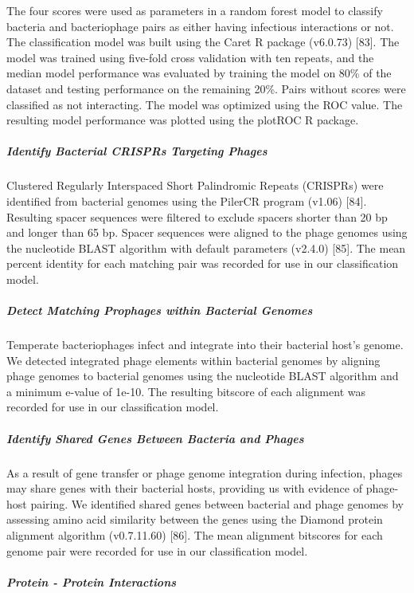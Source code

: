 \documentclass[12pt,]{article}
\let\oldsubparagraph\subparagraph
\renewcommand{\subparagraph}[1]{\oldsubparagraph{#1}\mbox{}}
\begin{document}
The four scores were used as parameters in a random forest model to
classify bacteria and bacteriophage pairs as either having infectious
interactions or not. The classification model was built using the Caret
R package (v6.0.73) {[}83{]}. The model was trained using five-fold
cross validation with ten repeats, and the median model performance was
evaluated by training the model on 80\% of the dataset and testing
performance on the remaining 20\%. Pairs without scores were classified
as not interacting. The model was optimized using the ROC value. The
resulting model performance was plotted using the plotROC R package.

\subparagraph{Identify Bacterial CRISPRs Targeting
Phages}\label{identify-bacterial-crisprs-targeting-phages}

Clustered Regularly Interspaced Short Palindromic Repeats (CRISPRs) were
identified from bacterial genomes using the PilerCR program (v1.06)
{[}84{]}. Resulting spacer sequences were filtered to exclude spacers
shorter than 20 bp and longer than 65 bp. Spacer sequences were aligned
to the phage genomes using the nucleotide BLAST algorithm with default
parameters (v2.4.0) {[}85{]}. The mean percent identity for each
matching pair was recorded for use in our classification model.

\subparagraph{Detect Matching Prophages within Bacterial
Genomes}\label{detect-matching-prophages-within-bacterial-genomes}

Temperate bacteriophages infect and integrate into their bacterial
host's genome. We detected integrated phage elements within bacterial
genomes by aligning phage genomes to bacterial genomes using the
nucleotide BLAST algorithm and a minimum e-value of 1e-10. The resulting
bitscore of each alignment was recorded for use in our classification
model.

\subparagraph{Identify Shared Genes Between Bacteria and
Phages}\label{identify-shared-genes-between-bacteria-and-phages}

As a result of gene transfer or phage genome integration during
infection, phages may share genes with their bacterial hosts, providing
us with evidence of phage-host pairing. We identified shared genes
between bacterial and phage genomes by assessing amino acid similarity
between the genes using the Diamond protein alignment algorithm
(v0.7.11.60) {[}86{]}. The mean alignment bitscores for each genome pair
were recorded for use in our classification model.

\subparagraph{Protein - Protein
Interactions}\label{protein---protein-interactions}
\end{document}
